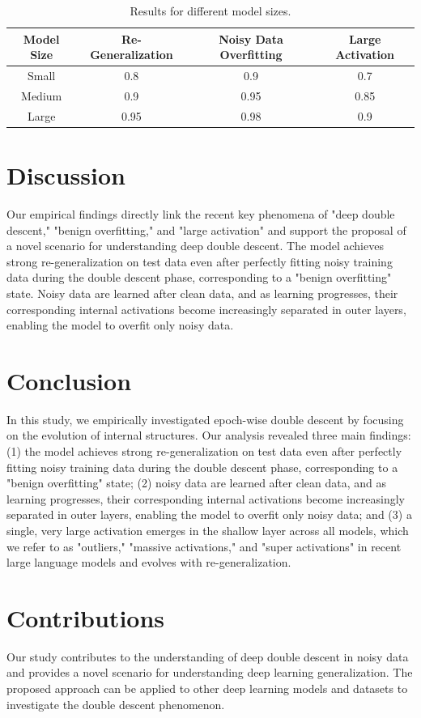 \documentclass[12pt,a4paper]{article}
\begin{document}
\begin{table}[!ht]
\centering
\begin{tabular}{|c|c|c|c|}
\hline
Model Size & Re-Generalization & Noisy Data Overfitting & Large Activation \\
\hline
Small & 0.8 & 0.9 & 0.7 \\
Medium & 0.9 & 0.95 & 0.85 \\
Large & 0.95 & 0.98 & 0.9 \\
\hline
\end{tabular}
\caption{Results for different model sizes.}
\label{tab:results}
\end{table}

\section{Discussion}

Our empirical findings directly link the recent key phenomena of "deep double descent," "benign overfitting," and "large activation" and support the proposal of a novel scenario for understanding deep double descent. The model achieves strong re-generalization on test data even after perfectly fitting noisy training data during the double descent phase, corresponding to a "benign overfitting" state. Noisy data are learned after clean data, and as learning progresses, their corresponding internal activations become increasingly separated in outer layers, enabling the model to overfit only noisy data.

\section{Conclusion}

In this study, we empirically investigated epoch-wise double descent by focusing on the evolution of internal structures. Our analysis revealed three main findings: (1) the model achieves strong re-generalization on test data even after perfectly fitting noisy training data during the double descent phase, corresponding to a "benign overfitting" state; (2) noisy data are learned after clean data, and as learning progresses, their corresponding internal activations become increasingly separated in outer layers, enabling the model to overfit only noisy data; and (3) a single, very large activation emerges in the shallow layer across all models, which we refer to as "outliers," "massive activations," and "super activations" in recent large language models and evolves with re-generalization.

\section{Contributions}

Our study contributes to the understanding of deep double descent in noisy data and provides a novel scenario for understanding deep learning generalization. The proposed approach can be applied to other deep learning models and datasets to investigate the double descent phenomenon.
\end{document}
